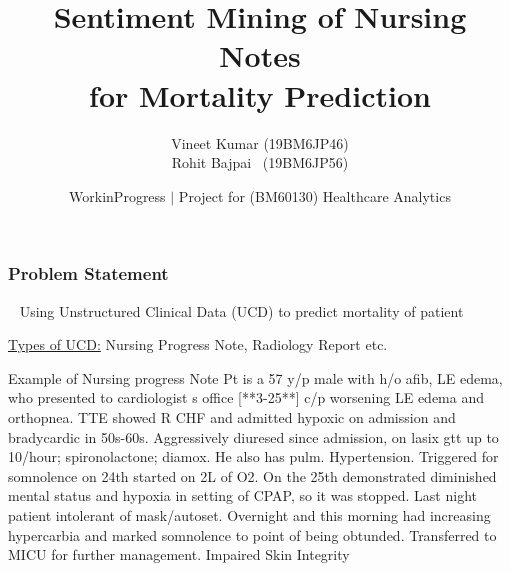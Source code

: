 \documentclass[11pt]{beamer}
\begin{document}
	\author[Kumar, Bajpai]{Vineet Kumar (19BM6JP46) \\ Rohit Bajpai ~(19BM6JP56)}
	\title[Sentiment Mining of Nursing Notes]{\textbf{Sentiment Mining of Nursing Notes \\for Mortality Prediction}}
	\date[\today]{\colorbox{blue!10}{WorkinProgress} \normalcolor $ |$ Project for (BM60130) Healthcare Analytics}
	\begin{frame}[plain]
		\maketitle
	\end{frame}
	
	\begin{frame}
		\frametitle{Problem Statement}
		\begin{block}~
			Using Unstructured Clinical Data (UCD) to predict mortality of patient
		\end{block}
\underline{Types of UCD:}
	Nursing Progress Note, Radiology Report etc.\pause 
	\begin{block}{Example of Nursing progress Note}
		Pt is a 57 y/p male with h/o afib, LE edema, who presented to
		cardiologist
		s office [**3-25**] c/p worsening LE edema and orthopnea. TTE
		showed R CHF and admitted
		hypoxic on admission and bradycardic in
		50s-60s. Aggressively diuresed since admission, on lasix gtt up to
		10/hour; spironolactone; diamox. He also has pulm. Hypertension.
		Triggered for somnolence  on 24th
		started on 2L of O2. On the 25th
		demonstrated diminished mental status and hypoxia in setting of CPAP,
		so it was stopped. Last night patient intolerant of mask/autoset.
		Overnight and this morning had increasing hypercarbia and marked
		somnolence to point of being obtunded. Transferred to MICU for further
		management.
		Impaired Skin Integrity
	\end{block} 
	\end{frame}
\end{document}
